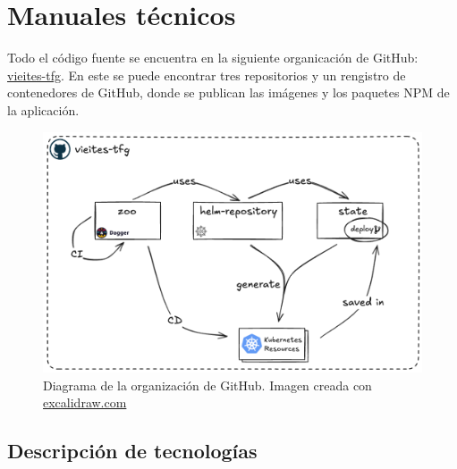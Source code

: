 \chapter{Manuales técnicos}

Todo el código fuente se encuentra en la siguiente organicación de GitHub: \href{https://github.com/vieites-tfg}{vieites-tfg}. En este se puede encontrar tres repositorios y un rengistro de contenedores de GitHub, donde se publican las imágenes y los paquetes NPM de la aplicación.

\begin{figure}[h]
  \centerline{\includegraphics[width=14cm]{figuras/vieites-tfg}}
  \caption{Diagrama de la organización de GitHub. Imagen creada con \href{https://excalidraw.com}{excalidraw.com}}
  \label{fig:ghorg}
\end{figure}

\section{Descripción de tecnologías}
\label{sec:tech-desc}

